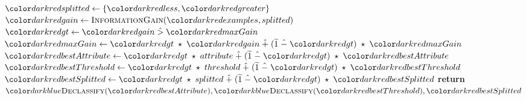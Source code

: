 \begin{algorithm}[H]
\begin{algorithmic}[1]
          \State $\red{splitted} \gets \{\red{less}, \red{greater}\}$
          \State $\red{gain} \gets  \textsc{InformationGain}(\red{examples}, splitted)$
          \State $\red{gt} \gets \red{gain} \hgt  \red{maxGain}$
          \State $\red{maxGain} \gets \red{gt} \hmul \red{gain} \hplus (\enc{1} \hminus \red{gt}) \hmul \red{maxGain}$
          \State $\red{bestAttribute} \gets \red{gt} \hmul attribute \hplus (\enc{1} \hminus \red{gt}) \hmul \red{bestAttribute}$
          \State $\red{bestThreshold} \gets \red{gt} \hmul threshold \hplus (\enc{1} \hminus \red{gt}) \hmul \red{bestThreshold}$
          \State $\red{bestSplitted} \gets \red{gt} \hmul splitted \hplus (\enc{1} \hminus \red{gt}) \hmul \red{bestSplitted}$
        \EndFor
    \EndIf
  \EndFor
  \State \textbf{return} $\blue{\textsc{Declassify}}(\red{bestAttribute}), \blue{\textsc{Declassify}}(\red{bestThreshold}), \red{bestSplitted}$
\EndProcedure
\end{algorithmic}
\end{algorithm}

